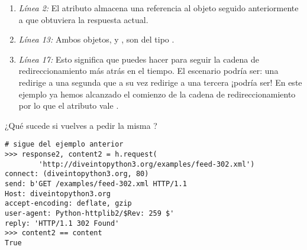 \begin{enumerate}

\item \emph{Línea 2:} El atributo  almacena una referencia al objeto  seguido anteriormente a que  obtuviera la respuesta actual.

\item \emph{Línea 13:} Ambos objetos,  y , son del tipo .

\item \emph{Línea 17:} Esto significa que puedes hacer  para seguir la cadena de redireccionamiento más atrás en el tiempo. El escenario podría ser: una  redirige a una segunda  que a su vez redirige a una tercera ¡podría ser! En este ejemplo ya hemos alcanzado el comienzo de la cadena de redireccionamiento por lo que el atributo vale .

\end{enumerate}

¿Qué sucede si vuelves a pedir la misma ?

\noindent\begin{minipage}{\textwidth}
\begin{lstlisting}[mathescape=True]
# sigue del ejemplo anterior
>>> response2, content2 = h.request(
        'http://diveintopython3.org/examples/feed-302.xml')
connect: (diveintopython3.org, 80)
send: b'GET /examples/feed-302.xml HTTP/1.1               
Host: diveintopython3.org
accept-encoding: deflate, gzip
user-agent: Python-httplib2/$Rev: 259 $'
reply: 'HTTP/1.1 302 Found'                              
>>> content2 == content                                 
True
\end{lstlisting}
\end{minipage}

